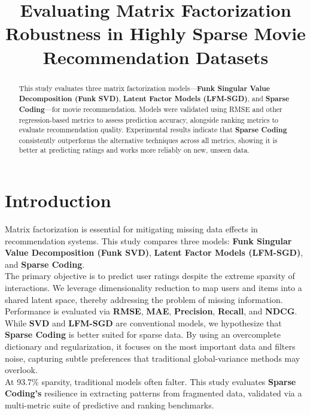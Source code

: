 \documentclass[conference]{IEEEtran}
\begin{document}
\title{Evaluating Matrix Factorization Robustness in Highly Sparse Movie Recommendation Datasets}

\author{
}


\maketitle
\renewcommand{\abstractname}{Summary}
\begin{abstract}
	This study evaluates three matrix factorization models---\textbf{Funk Singular Value Decomposition (Funk SVD)}, \textbf{Latent Factor Models (LFM-SGD)}, and \textbf{Sparse Coding}---for movie recommendation. Models were validated using RMSE and other regression-based metrics to assess prediction accuracy, alongside ranking metrics to evaluate recommendation quality. Experimental results indicate that \textbf{Sparse Coding} consistently outperforms the alternative techniques across all metrics, showing it is better at predicting ratings and works more reliably on new, unseen data.
\end{abstract}

\section{\textbf{Introduction}}\indent Matrix factorization is essential for mitigating missing data effects in recommendation systems. This study compares three models: \textbf{Funk Singular Value Decomposition (Funk SVD)}, \textbf{Latent Factor Models (LFM-SGD)}, and \textbf{Sparse Coding}.\\
\indent The primary objective is to predict user ratings despite the extreme sparsity of interactions. We leverage dimensionality reduction to map users and items into a shared latent space, thereby addressing the problem of missing information. Performance is evaluated via \textbf{RMSE}, \textbf{MAE}, \textbf{Precision}, \textbf{Recall}, and \textbf{NDCG}.\\
\indent While \textbf{SVD} and \textbf{LFM-SGD} are conventional models, we hypothesize that \textbf{Sparse Coding} is better suited for sparse data. By using an overcomplete dictionary and regularization, it focuses on the most important data and filters noise, capturing subtle preferences that traditional global-variance methods may overlook.\\
\indent At 93.7\% sparsity, traditional models often falter. This study evaluates \textbf{Sparse Coding's} resilience in extracting patterns from fragmented data, validated via a multi-metric suite of predictive and ranking benchmarks.
\end{document}
